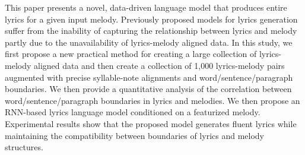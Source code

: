 This paper presents a novel, data-driven language model that produces entire lyrics for a given input melody. Previously proposed models for lyrics generation suffer from the inability of capturing the relationship between lyrics and melody partly due to the unavailability of lyrics-melody aligned data. In this study, we first propose a new practical method for creating a large collection of lyrics-melody aligned data and then create a collection of 1,000 lyrics-melody pairs augmented with precise syllable-note alignments and word/sentence/paragraph boundaries. We then provide a quantitative analysis of the correlation between word/sentence/paragraph boundaries in lyrics and melodies. We then propose an RNN-based lyrics language model conditioned on a featurized melody. Experimental results show that the proposed model generates fluent lyrics while maintaining the compatibility between boundaries of lyrics and melody structures.
